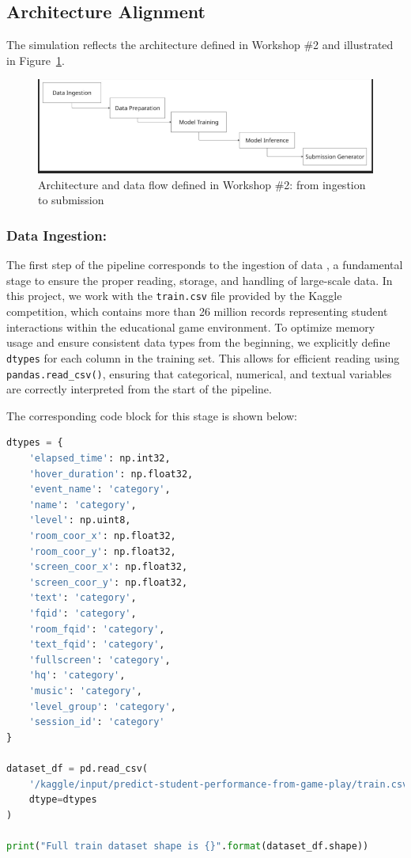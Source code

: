 \documentclass[12pt]{article}
\begin{document}
	\subsection{Architecture Alignment}
	The simulation reflects the architecture defined in Workshop \#2 and illustrated in Figure~\ref{fig:pipeline}.

    \begin{figure}[H]
        \centering
        \includegraphics[width=0.9\linewidth]{src/pipeline.png}
        \caption{Architecture and data flow defined in Workshop \#2: from ingestion to submission}
        \label{fig:pipeline}
    \end{figure}

	
	\subsubsection{Data Ingestion:}
	The first step of the pipeline corresponds to the ingestion of data \textbf{}, a fundamental stage to ensure the proper reading, storage, and handling of large-scale data. In this project, we work with the \texttt{train.csv} file provided by the Kaggle competition, which contains more than 26 million records representing student interactions within the educational game environment.
	To optimize memory usage and ensure consistent data types from the beginning, we explicitly define \texttt{ dtypes} for each column in the training set. This allows for efficient reading using \texttt{pandas.read\_csv()}, ensuring that categorical, numerical, and textual variables are correctly interpreted from the start of the pipeline.
	
	The corresponding code block for this stage is shown below:
	
	\begin{lstlisting}[language=Python, caption=Explicit Data Typing and Ingestion, basicstyle=\ttfamily\small, breaklines=true]
dtypes = {
    'elapsed_time': np.int32,
    'hover_duration': np.float32,
    'event_name': 'category',
    'name': 'category',
    'level': np.uint8,
    'room_coor_x': np.float32,
    'room_coor_y': np.float32,
    'screen_coor_x': np.float32,
    'screen_coor_y': np.float32,
    'text': 'category',
    'fqid': 'category',
    'room_fqid': 'category',
    'text_fqid': 'category',
    'fullscreen': 'category',
    'hq': 'category',
    'music': 'category',
    'level_group': 'category',
    'session_id': 'category'
}

dataset_df = pd.read_csv(
    '/kaggle/input/predict-student-performance-from-game-play/train.csv',
    dtype=dtypes
)

print("Full train dataset shape is {}".format(dataset_df.shape))
\end{lstlisting}
\end{document}
